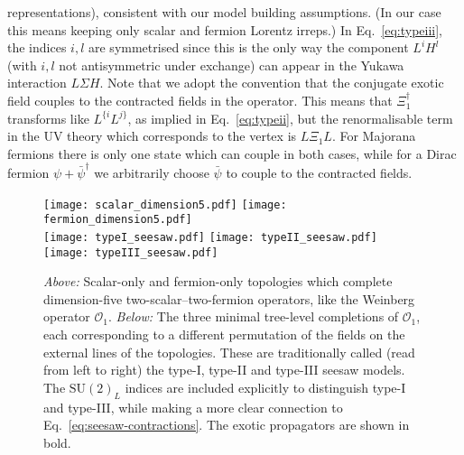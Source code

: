 representations), consistent with our model building assumptions. (In our case
this means keeping only scalar and fermion Lorentz irreps.) In
Eq.~\eqref{eq:typeiii}, the indices $i,l$ are symmetrised since this is the only
way the component $L^{i}H^{l}$ (with $i,l$ not antisymmetric under exchange) can
appear in the Yukawa interaction $L \Sigma H$. Note that we adopt the convention
that the conjugate exotic field couples to the contracted fields in the
operator. This means that $\Xi_{1}^{\dagger}$ transforms like $L^{\{i} L^{j\}}$,
as implied in Eq.~\eqref{eq:typeii}, but the renormalisable term in the UV
theory which corresponds to the vertex is $L\Xi_{1}L$. For Majorana fermions
there is only one state which can couple in both cases, while for a Dirac
fermion $\psi + \bar{\psi}^{\dagger}$ we arbitrarily choose $\bar{\psi}$ to
couple to the contracted fields.

\begin{figure}[t]
  \centering
  \texttt{[image: scalar\_dimension5.pdf]}
  \texttt{[image: fermion\_dimension5.pdf]}\\
  \texttt{[image: typeI\_seesaw.pdf]}
  \texttt{[image: typeII\_seesaw.pdf]}
  \texttt{[image: typeIII\_seesaw.pdf]}
  \caption{\textit{Above:} Scalar-only and fermion-only topologies which
    complete dimension-five two-scalar--two-fermion operators, like the Weinberg
    operator $\mathcal{O}_{1}$. \textit{Below:} The three minimal tree-level
    completions of $\mathcal{O}_{1}$, each corresponding to a different
    permutation of the fields on the external lines of the topologies. These are
    traditionally called (read from left to right) the type-I, type-II and
    type-III seesaw models. The $\mathrm{SU}(2)_{L}$ indices are included
    explicitly to distinguish type-I and type-III, while making a more clear
    connection to Eq.~\eqref{eq:seesaw-contractions}. The exotic propagators are
    shown in bold.}
  \label{fig:seesaw-figs}
\end{figure}

